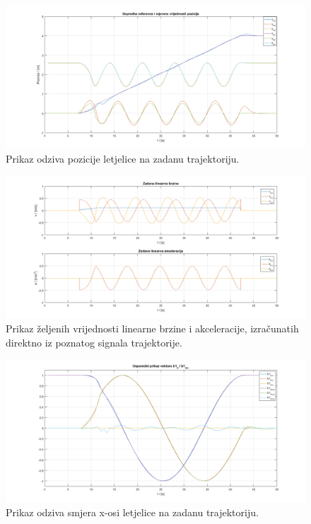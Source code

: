 \documentclass[times, utf8, diplomski]{fer}
\begin{document}
	\begin{figure}[h!]
		\includegraphics[width=\textwidth]{plots/traj_pos.png}
		\caption{Prikaz odziva pozicije letjelice na zadanu trajektoriju.}
	\end{figure}
	
	\newpage
	\clearpage
	
	\begin{figure}[h!]
		\includegraphics[width=\textwidth]{plots/traj_a_v.png}
		\caption{Prikaz željenih vrijednosti linearne brzine i akceleracije, izračunatih direktno iz poznatog signala trajektorije.}
	\end{figure}
	
	\begin{figure}[h!]
		\includegraphics[width=\textwidth]{plots/traj_b1d.png}
		\caption{Prikaz odziva smjera x-osi letjelice na zadanu trajektoriju. }
	\end{figure}
	
\end{document}
